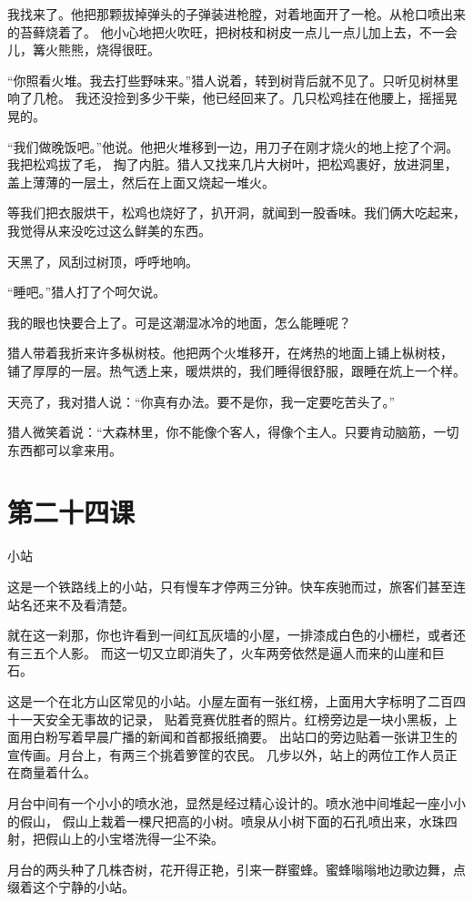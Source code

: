 \documentclass[12pt,UTF8]{ctexbook}
\begin{document}
我找来了。他把那颗拔掉弹头的子弹装进枪膛，对着地面开了一枪。从枪口喷出来的苔藓烧着了。
他小心地把火吹旺，把树枝和树皮一点儿一点儿加上去，不一会儿，篝火熊熊，烧得很旺。

“你照看火堆。我去打些野味来。”猎人说着，转到树背后就不见了。只听见树林里响了几枪。
我还没捡到多少干柴，他已经回来了。几只松鸡挂在他腰上，摇摇晃晃的。

“我们做晚饭吧。”他说。他把火堆移到一边，用刀子在刚才烧火的地上挖了个洞。我把松鸡拔了毛，
掏了内脏。猎人又找来几片大树叶，把松鸡裹好，放进洞里，盖上薄薄的一层土，然后在上面又烧起一堆火。

等我们把衣服烘干，松鸡也烧好了，扒开洞，就闻到一股香味。我们俩大吃起来，我觉得从来没吃过这么鲜美的东西。

天黑了，风刮过树顶，呼呼地响。

“睡吧。”猎人打了个呵欠说。

我的眼也快要合上了。可是这潮湿冰冷的地面，怎么能睡呢？

猎人带着我折来许多枞树枝。他把两个火堆移开，在烤热的地面上铺上枞树枝，
铺了厚厚的一层。热气透上来，暖烘烘的，我们睡得很舒服，跟睡在炕上一个样。

天亮了，我对猎人说：“你真有办法。要不是你，我一定要吃苦头了。”

猎人微笑着说：“大森林里，你不能像个客人，得像个主人。只要肯动脑筋，一切东西都可以拿来用。

\section{第二十四课}

小站

这是一个铁路线上的小站，只有慢车才停两三分钟。快车疾驰而过，旅客们甚至连站名还来不及看清楚。

就在这一刹那，你也许看到一间红瓦灰墙的小屋，一排漆成白色的小栅栏，或者还有三五个人影。
而这一切又立即消失了，火车两旁依然是逼人而来的山崖和巨石。

这是一个在北方山区常见的小站。小屋左面有一张红榜，上面用大字标明了二百四十一天安全无事故的记录，
贴着竞赛优胜者的照片。红榜旁边是一块小黑板，上面用白粉写着早晨广播的新闻和首都报纸摘要。
出站口的旁边贴着一张讲卫生的宣传画。月台上，有两三个挑着箩筐的农民。
几步以外，站上的两位工作人员正在商量着什么。

月台中间有一个小小的喷水池，显然是经过精心设计的。喷水池中间堆起一座小小的假山，
假山上栽着一棵尺把高的小树。喷泉从小树下面的石孔喷出来，水珠四射，把假山上的小宝塔洗得一尘不染。

月台的两头种了几株杏树，花开得正艳，引来一群蜜蜂。蜜蜂嗡嗡地边歌边舞，点缀着这个宁静的小站。
\end{document}
